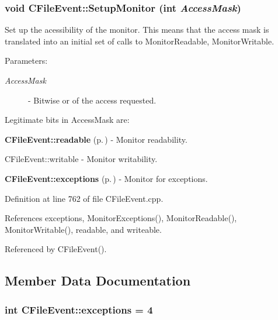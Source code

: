 \subsubsection{\setlength{\rightskip}{0pt plus 5cm}void CFile\-Event::Setup\-Monitor (int {\em Access\-Mask})\hspace{0.3cm}{\tt  [protected]}}\label{classCFileEvent_b1}


Set up the acessibility of the monitor. This means that the access mask is translated into an initial set of calls to  Monitor\-Readable, Monitor\-Writable.\begin{Desc}
\item[Parameters: ]\par
\begin{description}
\item[{\em 
Access\-Mask}]- Bitwise or of the access requested.\end{description}
\end{Desc}
Legitimate bits in Access\-Mask are:\begin{CompactItemize}
\item 
{\bf CFile\-Event::readable} {\rm (p.\,\pageref{classCFileEvent_p0})} - Monitor readability.\item 
CFile\-Event::writable - Monitor writability.\item 
{\bf CFile\-Event::exceptions} {\rm (p.\,\pageref{classCFileEvent_p2})} - Monitor for exceptions. \end{CompactItemize}


Definition at line 762 of file CFile\-Event.cpp.

References exceptions, Monitor\-Exceptions(), Monitor\-Readable(), Monitor\-Writable(), readable, and writeable.

Referenced by CFile\-Event().

\subsection{Member Data Documentation}
\subsubsection{\setlength{\rightskip}{0pt plus 5cm}int CFile\-Event::exceptions = 4\hspace{0.3cm}{\tt  [static]}}\label{classCFileEvent_p2}


